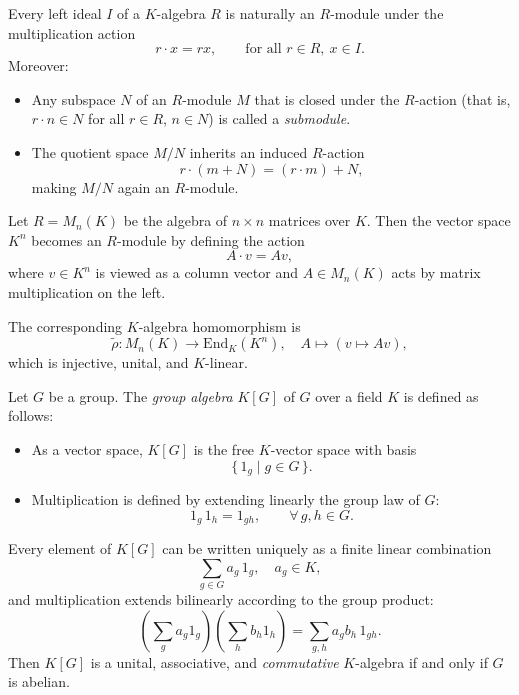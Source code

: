 \begin{example}\label{ex:leftideal_module}
Every left ideal $I$ of a $K$-algebra $R$ is naturally an $R$-module under the multiplication action
\[
r\cdot x = r x, \qquad \text{for all } r\in R,\ x\in I.
\]
Moreover:
\begin{itemize}
    \item Any subspace $N$ of an $R$-module $M$ that is closed under the $R$-action
    (that is, $r\cdot n\in N$ for all $r\in R$, $n\in N$)
    is called a \emph{submodule}.
    \item The quotient space $M/N$ inherits an induced $R$-action
    \[
    r\cdot(m+N) = (r\cdot m) + N,
    \]
    making $M/N$ again an $R$-module.
\end{itemize}
\end{example}

\begin{example}\label{ex:MnK-module}
Let $R = M_n(K)$ be the algebra of $n\times n$ matrices over $K$.  
Then the vector space $K^n$ becomes an $R$-module by defining the action
\[
A\cdot v = A v,
\]
where $v\in K^n$ is viewed as a column vector and $A\in M_n(K)$ acts by matrix multiplication on the left.

The corresponding $K$-algebra homomorphism is
\[
\tilde{\rho}: M_n(K)\longrightarrow \mathrm{End}_K(K^n), \quad A\longmapsto (v\mapsto Av),
\]
which is injective, unital, and $K$-linear.
\end{example}

\begin{definition}\label{def:group_algebra}
Let $G$ be a group.  
The \emph{group algebra} $K[G]$ of $G$ over a field $K$ is defined as follows:
\begin{itemize}
    \item As a vector space, $K[G]$ is the free $K$-vector space with basis
    \[
    \{\,1_g \mid g\in G\,\}.
    \]
    \item Multiplication is defined by extending linearly the group law of $G$:
    \[
    1_g\,1_h = 1_{gh}, \qquad \forall\, g,h\in G.
    \]
\end{itemize}
\end{definition}

\begin{remark}
Every element of $K[G]$ can be written uniquely as a finite linear combination
\[
\sum_{g\in G} a_g\,1_g,\quad a_g\in K,
\]
and multiplication extends bilinearly according to the group product:
\[
\left(\sum_g a_g 1_g\right)\!\left(\sum_h b_h 1_h\right)
= \sum_{g,h} a_g b_h\,1_{gh}.
\]
Then $K[G]$ is a unital, associative, and \emph{commutative} $K$-algebra if and only if $G$ is abelian.
\end{remark}

